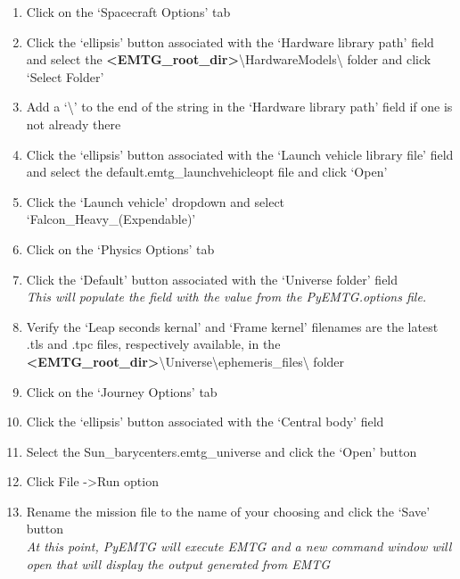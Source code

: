 \begin{enumerate}
	\item Click on the `Spacecraft Options' tab 
	\item Click the `ellipsis' button associated with the `Hardware library path' field and select the \textbf{\textless EMTG\_root\_dir\textgreater}\textbackslash HardwareModels\textbackslash \hspace{1pt} folder and click `Select Folder'
	\item Add a `\textbackslash' \hspace{1pt} to the end of the string in the `Hardware library path' field if one is not already there
	\item Click the `ellipsis' button associated with the `Launch vehicle library file' field and select the default.emtg\_launchvehicleopt file and click `Open'
	\item Click the `Launch vehicle' dropdown and select `Falcon\_Heavy\_(Expendable)'
	\item Click on the `Physics Options' tab 
	\item Click the `Default' button associated with the `Universe folder' field \\ \emph{This will populate the field with the value from the PyEMTG.options file.}
	\item Verify the `Leap seconds kernal' and `Frame kernel' filenames are the latest .tls and .tpc files, respectively available, in the \textbf{\textless EMTG\_root\_dir\textgreater}\textbackslash Universe\textbackslash ephemeris\_files\textbackslash \hspace{1pt} folder
	\item Click on the `Journey Options' tab 
	\item Click the `ellipsis' button associated with the `Central body' field
	\item Select the Sun\_barycenters.emtg\_universe and click the `Open' button
	\item Click File -\textgreater \hspace{1pt}Run option
	\item Rename the mission file to the name of your choosing and click the `Save' button \\ \emph{At this point, PyEMTG will execute EMTG and a new command window will open that will display the output generated from EMTG}
\end{enumerate}